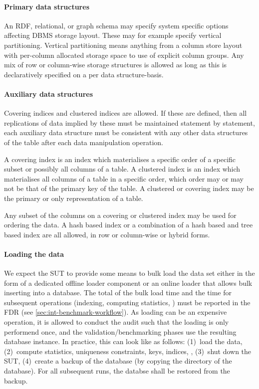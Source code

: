 \paragraph{Primary data structures}
An RDF, relational, or graph schema may specify system specific options affecting DBMS storage layout. These may for example specify vertical partitioning. Vertical partitioning means anything from a column store layout with per-column allocated storage space to use of explicit column groups. Any mix of row or column-wise storage structures is allowed as long as this is declaratively specified on a per data structure-basis.

\paragraph{Auxiliary data structures}
Covering indices and clustered indices are allowed. If these are defined, then all replications of data implied by these must be maintained statement by statement, \ie each auxiliary data structure must be consistent with any other data structures of the table after each data manipulation operation.

A covering index is an index which materialises a specific order of a specific subset or possibly all columns of a table. 
A clustered index is an index which materialises all columns of a table in a specific order, which order may or may not be that of the primary key of the table. A clustered or covering index may be the primary or only representation of a table.

Any subset of the columns on a covering or clustered index may be used for ordering the data. A hash based index or a combination of a hash based and tree based index are all allowed, in row or column-wise or hybrid forms.

\paragraph{Loading the data}

We expect the SUT to provide some means to bulk load the data set either in the form of a dedicated offline loader component or an online loader that allows bulk inserting into a database.
The total of the bulk load time and the time for subsequent operations (indexing, computing statistics, \etc) must be reported in the FDR (see \autoref{sec:int-benchmark-workflow}).
As loading can be an expensive operation, it is allowed to conduct the audit such that the loading is only performend once, and the validation/benchmarking phases use the resulting database instance.
In practice, this can look like as follows:
(1)~load the data,
(2)~compute statistics, uniqueness constraints, keys, indices, \etc,
(3)~shut down the SUT,
(4)~create a backup of the database (\eg by copying the directory of the database).
For all subsequent runs, the databse shall be restored from the backup.

